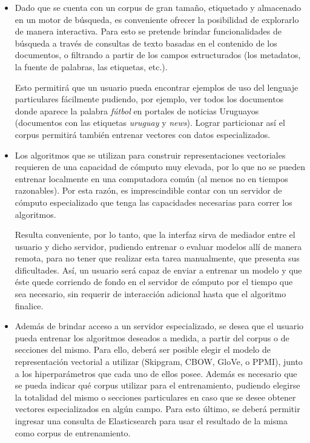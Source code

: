 \begin{itemize}

\item Dado que se cuenta con un corpus de gran tamaño, etiquetado y almacenado en un motor de
búsqueda, es conveniente ofrecer la posibilidad de explorarlo de manera interactiva. Para esto se
pretende brindar funcionalidades de búsqueda a través de consultas de texto basadas en el contenido
de los documentos, o filtrando a partir de los campos estructurados (los metadatos, la fuente de
palabras, las etiquetas, etc.).

Esto permitirá que un usuario pueda encontrar ejemplos de uso del lenguaje particulares fácilmente
pudiendo, por ejemplo, ver todos los documentos donde aparece la palabra \textit{fútbol} en portales
de noticias Uruguayos (documentos con las etiquetas \textit{uruguay} y \textit{news}). Lograr
particionar así el corpus permitirá también entrenar vectores con datos especializados.

\item Los algoritmos que se utilizan para construir representaciones vectoriales requieren de una
capacidad de cómputo muy elevada, por lo que no se pueden entrenar localmente en una computadora
común (al menos no en tiempos razonables). Por esta razón, es imprescindible contar con un servidor
de cómputo especializado que tenga las capacidades necesarias para correr los algoritmos.

Resulta conveniente, por lo tanto, que la interfaz sirva de mediador entre el usuario y dicho
servidor, pudiendo entrenar o evaluar modelos allí de manera remota, para no tener que realizar esta
tarea manualmente, que presenta sus dificultades. Así, un usuario será capaz de enviar a entrenar un
modelo y que éste quede corriendo de fondo en el servidor de cómputo por el tiempo que sea
necesario, sin requerir de interacción adicional hasta que el algoritmo finalice.

\item Además de brindar acceso a un servidor especializado, se desea que el usuario pueda entrenar
los algoritmos deseados a medida, a partir del corpus o de secciones del mismo. Para ello, deberá
ser posible elegir el modelo de representación vectorial a utilizar (Skipgram, CBOW, GloVe, o PPMI),
junto a los hiperparámetros que cada uno de ellos posee. Además es necesario que se pueda indicar
qué corpus utilizar para el entrenamiento, pudiendo elegirse la totalidad del mismo o secciones
particulares en caso que se desee obtener vectores especializados en algún campo. Para esto último,
se deberá permitir ingresar una consulta de Elasticsearch para usar el resultado de la misma como
corpus de entrenamiento.


\end{itemize}
